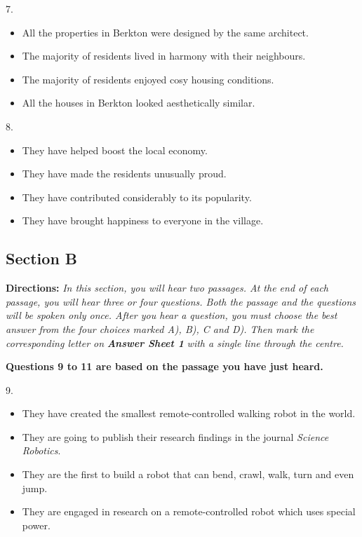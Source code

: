 \documentclass[UTF8,11pt]{ctexart}
\begin{document}
7.


\begin{itemize}[leftmargin=2em,itemsep=.2em,topsep=.4em]\item[A.] All the properties in Berkton were designed by the same architect.
\item[B.] The majority of residents lived in harmony with their neighbours.
\item[C.] The majority of residents enjoyed cosy housing conditions.
\item[D.] All the houses in Berkton looked aesthetically similar.
\end{itemize}

8.


\begin{itemize}[leftmargin=2em,itemsep=.2em,topsep=.4em]\item[A.] They have helped boost the local economy.
\item[B.] They have made the residents unusually proud.
\item[C.] They have contributed considerably to its popularity.
\item[D.] They have brought happiness to everyone in the village.
\end{itemize}

\subsection*{\textbf{Section B}}


\textbf{Directions:} \textit{In this section, you will hear two passages. At the end of each passage, you will hear three or four} \textit{questions. Both the passage and the questions will be spoken only once. After you hear a question, you must choose the} \textit{best answer from the four choices marked A), B), C and D). Then mark the corresponding letter on }\textbf{\textit{Answer Sheet 1}} \textit{with a single line through the centre.}


\textbf{Questions 9 to 11 are based on the passage you have just heard.}


9.


\begin{itemize}[leftmargin=2em,itemsep=.2em,topsep=.4em]\item[A.] They have created the smallest remote-controlled walking robot in the world.
\item[B.] They are going to publish their research findings in the journal \textit{Science Robotics}.
\item[C.] They are the first to build a robot that can bend, crawl, walk, turn and even jump.
\item[D.] They are engaged in research on a remote-controlled robot which uses special power.
\end{itemize}
\end{document}
